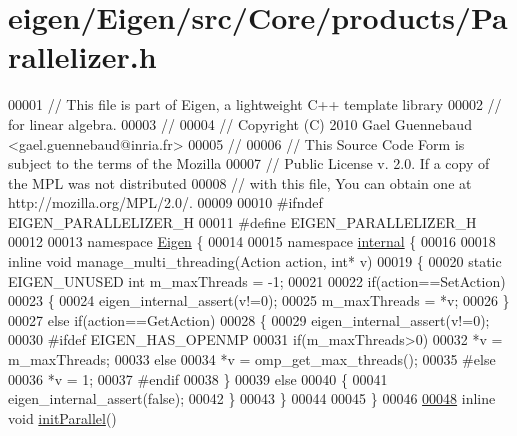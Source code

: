 \hypertarget{eigen_2_eigen_2src_2_core_2products_2_parallelizer_8h_source}{}\section{eigen/\+Eigen/src/\+Core/products/\+Parallelizer.h}
\label{eigen_2_eigen_2src_2_core_2products_2_parallelizer_8h_source}

\begin{DoxyCode}
00001 \textcolor{comment}{// This file is part of Eigen, a lightweight C++ template library}
00002 \textcolor{comment}{// for linear algebra.}
00003 \textcolor{comment}{//}
00004 \textcolor{comment}{// Copyright (C) 2010 Gael Guennebaud <gael.guennebaud@inria.fr>}
00005 \textcolor{comment}{//}
00006 \textcolor{comment}{// This Source Code Form is subject to the terms of the Mozilla}
00007 \textcolor{comment}{// Public License v. 2.0. If a copy of the MPL was not distributed}
00008 \textcolor{comment}{// with this file, You can obtain one at http://mozilla.org/MPL/2.0/.}
00009 
00010 \textcolor{preprocessor}{#ifndef EIGEN\_PARALLELIZER\_H}
00011 \textcolor{preprocessor}{#define EIGEN\_PARALLELIZER\_H}
00012 
00013 \textcolor{keyword}{namespace }\hyperlink{namespace_eigen}{Eigen} \{
00014 
00015 \textcolor{keyword}{namespace }\hyperlink{namespaceinternal}{internal} \{
00016 
00018 \textcolor{keyword}{inline} \textcolor{keywordtype}{void} manage\_multi\_threading(Action action, \textcolor{keywordtype}{int}* v)
00019 \{
00020   \textcolor{keyword}{static} EIGEN\_UNUSED \textcolor{keywordtype}{int} m\_maxThreads = -1;
00021 
00022   \textcolor{keywordflow}{if}(action==SetAction)
00023   \{
00024     eigen\_internal\_assert(v!=0);
00025     m\_maxThreads = *v;
00026   \}
00027   \textcolor{keywordflow}{else} \textcolor{keywordflow}{if}(action==GetAction)
00028   \{
00029     eigen\_internal\_assert(v!=0);
00030 \textcolor{preprocessor}{    #ifdef EIGEN\_HAS\_OPENMP}
00031     \textcolor{keywordflow}{if}(m\_maxThreads>0)
00032       *v = m\_maxThreads;
00033     \textcolor{keywordflow}{else}
00034       *v = omp\_get\_max\_threads();
00035 \textcolor{preprocessor}{    #else}
00036     *v = 1;
00037 \textcolor{preprocessor}{    #endif}
00038   \}
00039   \textcolor{keywordflow}{else}
00040   \{
00041     eigen\_internal\_assert(\textcolor{keyword}{false});
00042   \}
00043 \}
00044 
00045 \}
00046 
\hyperlink{namespace_eigen_a820c0e0460934cc17eb6dacbad54a9f5}{00048} \textcolor{keyword}{inline} \textcolor{keywordtype}{void} \hyperlink{namespace_eigen_a820c0e0460934cc17eb6dacbad54a9f5}{initParallel}()

\end{DoxyCode}
